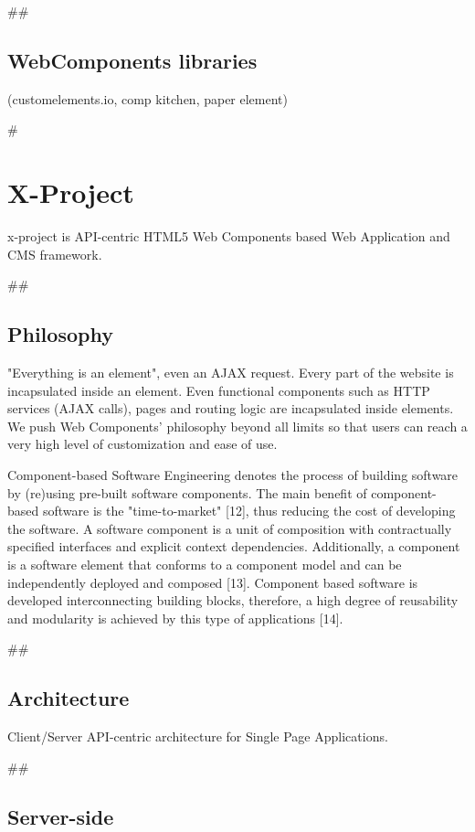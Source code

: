 \documentclass{sig-alternate}
\begin{document}
## \subsection{WebComponents libraries}

(customelements.io, comp kitchen, paper element)


# \section{X-Project}

x-project is API-centric HTML5 Web Components based Web Application and CMS framework.


## \subsection{Philosophy}

"Everything is an element", even an AJAX request. Every part of the website is incapsulated inside an element. Even functional components such as HTTP services (AJAX calls), pages and routing logic are incapsulated inside elements. We push Web Components' philosophy beyond all limits so that users can reach a very high level of customization and ease of use.

Component-based Software Engineering denotes the process of building software by (re)using pre-built software components. The main benefit of component-based software is the "time-to-market" [12], thus reducing the cost of developing the software. A software component is a unit of composition with contractually specified interfaces and explicit context dependencies. 
Additionally, a component is a software element that conforms to a component model and can be independently deployed and composed [13]. Component based software is developed interconnecting building blocks, therefore, a high degree of reusability and modularity is achieved by this type of applications [14]. 


## \subsection{Architecture}

Client/Server API-centric architecture for Single Page Applications.

## \subsection{Server-side}
\end{document}
